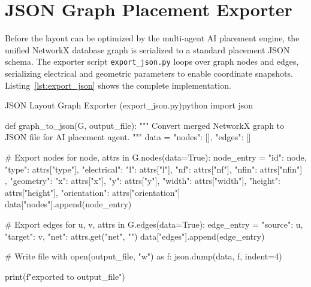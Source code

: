 \section[JSON Placement Exporter]{JSON Graph Placement Exporter}
\label{sec:json_exporter}

Before the layout can be optimized by the multi-agent AI placement engine, the unified NetworkX database graph is serialized to a standard placement JSON schema. The exporter script \texttt{export\_json.py} loops over graph nodes and edges, serializing electrical and geometric parameters to enable coordinate snapshots. Listing~\ref{lst:export_json} shows the complete implementation.

\begin{thesiscode}{JSON Layout Graph Exporter (export\_json.py)\label{lst:export_json}}{python}
import json

def graph_to_json(G, output_file):
    """
    Convert merged NetworkX graph to JSON file
    for AI placement agent.
    """
    data = {
        "nodes": [],
        "edges": []
    }

    # Export nodes
    for node, attrs in G.nodes(data=True):
        node_entry = {
            "id": node,
            "type": attrs["type"],
            "electrical": {
                "l": attrs["l"],
                "nf": attrs["nf"],
                "nfin": attrs["nfin"]
            },
            "geometry": {
                "x": attrs["x"],
                "y": attrs["y"],
                "width": attrs["width"],
                "height": attrs["height"],
                "orientation": attrs["orientation"]
            }
        }
        data["nodes"].append(node_entry)

    # Export edges
    for u, v, attrs in G.edges(data=True):
        edge_entry = {
            "source": u,
            "target": v,
            "net": attrs.get("net", "")
        }
        data["edges"].append(edge_entry)

    # Write file
    with open(output_file, "w") as f:
        json.dump(data, f, indent=4)

    print(f"\nJSON exported to {output_file}")
\end{thesiscode}

